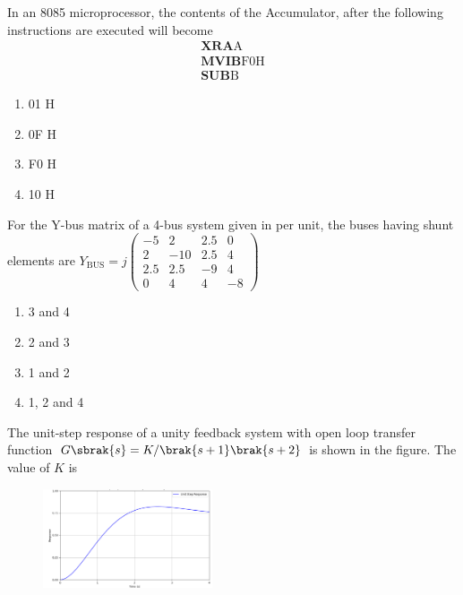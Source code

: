 \item In an 8085 microprocessor, the contents of the Accumulator, after the following instructions are executed will become
\begin{align*}
\mathbf{XRA} \text{A} \\
\mathbf{MVIB} \text{F0H}\\
\mathbf{SUB} \text{B}
\end{align*}
\begin{enumerate}
\item 01 H
\item 0F H
\item F0 H
\item 10 H
\end{enumerate}
\item For the Y-bus matrix of a 4-bus system given in per unit, the buses having shunt elements are
$
Y_{\text{BUS}} = j
\begin{pmatrix}
-5 & 2 & 2.5 & 0 \\
2 & -10 & 2.5 & 4 \\
2.5 & 2.5 & -9 & 4 \\
0 & 4 & 4 & -8
\end{pmatrix}
$
\begin{enumerate}
\item 3 and 4
\item 2 and 3
\item 1 and 2
\item 1, 2 and 4
\end{enumerate}
\item The unit-step response of a unity feedback system with open loop transfer function $G\sbrak{s}=K/{\brak{s+1}\brak{s+2}}$ is shown in the figure. The value of $K$ is
\begin{figure}[!ht]
    \centering
    \includegraphics[width=5cm]{./GATE-yearwise/2009/figs/fig1.png}
    \caption{}
    \end{figure}
